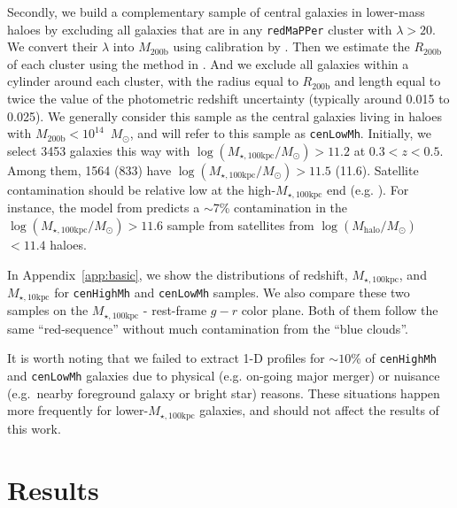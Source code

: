 \documentclass[a4paper,fleqn,usenatbib]{mnras}
\def\msun{$M_\odot$}
\def\redm{\texttt{redMaPPer}}
\def\rbcg{\texttt{cenHighMh}}
\def\nbcg{\texttt{cenLowMh}}
\def\logmh{{$\log (M_{\mathrm{halo}}/M_{\odot})$}}
\def\minn{{$M_{\star,10\mathrm{kpc}}$}}
\def\mtot{{$M_{\star,100\mathrm{kpc}}$}}
\def\logmtot{{$\log (M_{\star,100\mathrm{kpc}}/M_{\odot})$}}
\begin{document}
    Secondly, we build a complementary sample of central galaxies in lower-mass haloes
    by excluding all galaxies that are in any \redm{} cluster with $\lambda > 20$.
    We convert their $\lambda$ into $M_{\mathrm{200b}}$ using calibration by 
    \citet{Simet2016}. 
    Then we estimate the $R_{\mathrm{200b}}$ of each cluster using the method in 
    \citet{Diemer2015}. 
    And we exclude all galaxies within a cylinder around each cluster, with the radius
    equal to $R_{\mathrm{200b}}$ and length equal to twice the value of the photometric 
    redshift uncertainty (typically around 0.015 to 0.025). 
    We generally consider this sample as the central galaxies living in haloes with
    $M_{\mathrm{200b}} < 10^{14}$~\msun{}, and will refer to this sample as \nbcg{}.
    Initially, we select 3453 galaxies this way with \logmtot{}$> 11.2$ at 
    $0.3 < z < 0.5$. 
    Among them, 1564 (833) have \logmtot{}$> 11.5$ (11.6). 
    Satellite contamination should be relative low at the high-\mtot{} end
    (e.g. \citealt{Reid2014, Hoshino2015, Saito2016, vanUitert2016}). 
    For instance, the model from \citet{Saito2016} predicts a $\sim 7$\% 
    contamination in the \logmtot{}$>11.6$ sample from satellites from 
    \logmh$<11.4$ haloes.
    
    In Appendix~\ref{app:basic}, we show the distributions of redshift, \mtot{}, and 
    \minn{} for \rbcg{} and \nbcg{} samples. 
    We also compare these two samples on the \mtot{} - rest-frame $g-r$ color plane. 
    Both of them follow the same ``red-sequence'' without much contamination from the 
    ``blue clouds''. 
    
    It is worth noting that we failed to extract 1-D profiles for $\sim10$\% of 
    \rbcg{} and \nbcg{} galaxies due to physical (e.g. on-going major merger) or 
    nuisance (e.g.\ nearby foreground galaxy or bright star) reasons. 
    These situations happen more frequently for lower-\mtot{} galaxies, and should not 
    affect the results of this work.
    

\section{Results}
    \label{sec:result}
    
\end{document}

